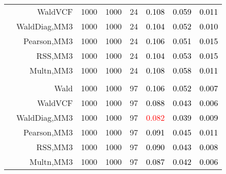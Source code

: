 \documentclass[
]{article}
\begin{document}
\begin{table}[H]
{\begin{tabular}[t]{lrrrrrrr}
\hspace{1em} & WaldVCF & 1000 & 1000 & 24 & \textcolor{black}{0.108} & \textcolor{black}{0.059} & \textcolor{black}{0.011}\\

\hspace{1em} & WaldDiag,MM3 & 1000 & 1000 & 24 & \textcolor{black}{0.104} & \textcolor{black}{0.052} & \textcolor{black}{0.010}\\

\hspace{1em} & Pearson,MM3 & 1000 & 1000 & 24 & \textcolor{black}{0.106} & \textcolor{black}{0.051} & \textcolor{black}{0.015}\\

\hspace{1em} & RSS,MM3 & 1000 & 1000 & 24 & \textcolor{black}{0.104} & \textcolor{black}{0.053} & \textcolor{black}{0.015}\\

\hspace{1em} & Multn,MM3 & 1000 & 1000 & 24 & \textcolor{black}{0.108} & \textcolor{black}{0.058} & \textcolor{black}{0.011}\\
\cmidrule{1-8}
\addlinespace[0.3em]
\multicolumn{8}{l}{\textbf{3F 15V}}\\
\hspace{1em} & Wald & 1000 & 1000 & 97 & \textcolor{black}{0.106} & \textcolor{black}{0.052} & \textcolor{black}{0.007}\\

\hspace{1em} & WaldVCF & 1000 & 1000 & 97 & \textcolor{black}{0.088} & \textcolor{black}{0.043} & \textcolor{black}{0.006}\\

\hspace{1em} & WaldDiag,MM3 & 1000 & 1000 & 97 & \textcolor{red}{0.082} & \textcolor{black}{0.039} & \textcolor{black}{0.009}\\

\hspace{1em} & Pearson,MM3 & 1000 & 1000 & 97 & \textcolor{black}{0.091} & \textcolor{black}{0.045} & \textcolor{black}{0.011}\\

\hspace{1em} & RSS,MM3 & 1000 & 1000 & 97 & \textcolor{black}{0.090} & \textcolor{black}{0.043} & \textcolor{black}{0.008}\\

\hspace{1em} & Multn,MM3 & 1000 & 1000 & 97 & \textcolor{black}{0.087} & \textcolor{black}{0.042} & \textcolor{black}{0.006}\\
\bottomrule
\end{tabular}}
\endgroup{}
\end{table}
\end{document}
